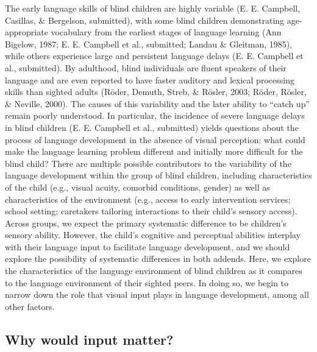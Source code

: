 \documentclass[
  man,floatsintext]{apa6}
\begin{document}
The early language skills of blind children are highly variable (E. E. Campbell, Casillas, \& Bergelson, submitted), with some blind children demonstrating age-appropriate vocabulary from the earliest stages of language learning (Ann Bigelow, 1987; E. E. Campbell et al., submitted; Landau \& Gleitman, 1985), while others experience large and persistent language delays (E. E. Campbell et al., submitted). By adulthood, blind individuals are fluent speakers of their language and are even reported to have faster auditory and lexical processing skills than sighted adults (Röder, Demuth, Streb, \& Rösler, 2003; Röder, Rösler, \& Neville, 2000). The causes of this variability and the later ability to ``catch up'' remain poorly understood. In particular, the incidence of severe language delays in blind children (E. E. Campbell et al., submitted) yields questions about the process of language development in the absence of visual perception: what could make the language learning problem different and initially more difficult for the blind child? There are multiple possible contributors to the variability of the language development within the group of blind children, including characteristics of the child (e.g., visual acuity, comorbid conditions, gender) as well as characteristics of the environment (e.g., access to early intervention services; school setting; caretakers tailoring interactions to their child's sensory access). Across groups, we expect the primary systematic difference to be children's sensory ability. However, the child's cognitive and perceptual abilities interplay with their language input to facilitate language development, and we should explore the possibility of systematic differences in both addends. Here, we explore the characteristics of the language environment of blind children as it compares to the language environment of their sighted peers. In doing so, we begin to narrow down the role that visual input plays in language development, among all other factors.

\hypertarget{why-would-input-matter}{%
\subsection{Why would input matter?}\label{why-would-input-matter}}
\end{document}
